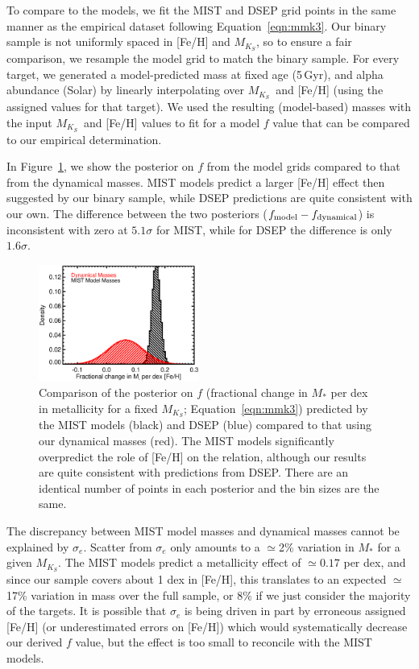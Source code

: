 \documentclass[twocolumn]{aastex62}
\newcommand{\mks}{$M_{K_S}$}
\begin{document}
To compare to the models, we fit the MIST and DSEP grid points in the same manner as the empirical dataset following Equation~\ref{eqn:mmk3}. Our binary sample is not uniformly spaced in [Fe/H] and \mks, so to ensure a fair comparison, we resample the model grid to match the binary sample. For every target, we generated a model-predicted mass at fixed age (5\,Gyr), and alpha abundance (Solar) by linearly interpolating over \mks\ and [Fe/H] (using the assigned values for that target). We used the resulting (model-based) masses with the input \mks\ and [Fe/H] values to fit for a model $f$ value that can be compared to our empirical determination.

In Figure~\ref{fig:f}, we show the posterior on $f$ from the model grids compared to that from the dynamical masses. MIST models predict a larger [Fe/H] effect then suggested by our binary sample, while DSEP predictions are quite consistent with our own. The difference between the two posteriors ($f_{\rm{model}}-f_{\rm{dynamical}}$) is inconsistent with zero at $5.1\sigma$ for MIST, while for DSEP the difference is only $1.6\sigma$. 

\begin{figure}[htp]
\begin{center}
\includegraphics[width=0.47\textwidth]{F_plot.eps}
\caption{Comparison of the posterior on $f$ (fractional change in $M_*$ per dex in metallicity for a fixed \mks; Equation~\ref{eqn:mmk3}) predicted by the MIST models (black) and DSEP (blue) compared to that using our dynamical masses (red). The MIST models significantly overpredict the role of [Fe/H] on the relation, although our results are quite consistent with predictions from DSEP. There are an identical number of points in each posterior and the bin sizes are the same. }
\label{fig:f}
\end{center}
\end{figure}

The discrepancy between MIST model masses and dynamical masses cannot be explained by $\sigma_e$. Scatter from $\sigma_e$ only amounts to a $\simeq$2\% variation in $M_*$ for a given \mks. The MIST models predict a metallicity effect of $\simeq0.17$ per dex, and since our sample covers about 1 dex in [Fe/H], this translates to an expected $\simeq$17\% variation in mass over the full sample, or 8\% if we just consider the majority of the targets. It is possible that $\sigma_e$ is being driven in part by erroneous assigned [Fe/H] (or underestimated errors on [Fe/H]) which would systematically decrease our derived $f$ value, but the effect is too small to reconcile with the MIST models. 
\end{document}
